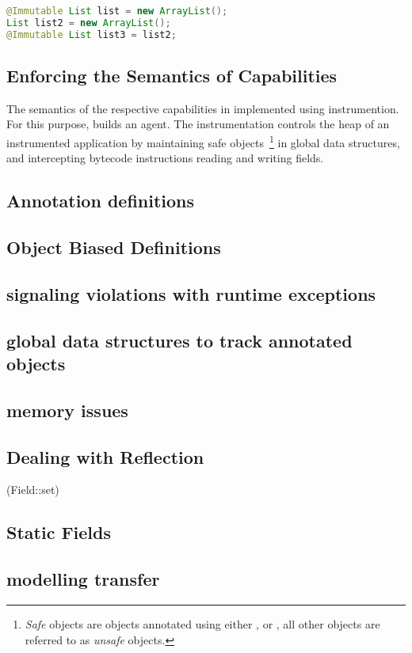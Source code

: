 \documentclass[JDala.tex]{subfiles}
\begin{document}
\begin{lstlisting}[language=Java, caption=Associating objects with capabilities, label=listing:annotation]
@Immutable List list = new ArrayList();
List list2 = new ArrayList();
@Immutable List list3 = list2;
\end{lstlisting}


\subsection{Enforcing the Semantics of Capabilities}

The semantics of the respective capabilities in implemented using instrumention. For this purpose, \jdala builds an agent. The instrumentation controls the heap of an instrumented application by maintaining safe objects~\footnote{\textit{Safe} objects are objects annotated using either \Immutable, \Isolated or \Local, all other objects are referred to as \textit{unsafe} objects.} in global data structures, and intercepting bytecode instructions reading and writing fields. 








	


\subsection{Annotation definitions}

\subsection{Object Biased Definitions}

\subsection{signaling violations with runtime exceptions}

\subsection{global data structures to track annotated objects}

\subsection{memory issues}

\subsection{Dealing with Reflection}
(Field::set)

\subsection{Static Fields}

\subsection{modelling transfer}
\end{document}
